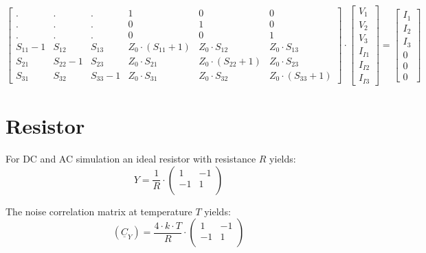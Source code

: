 \begin{equation}
\label{eqn:Sparam2mna}
\begin{bmatrix}
 . & . & .  &  1 & 0 & 0\\
 . & . & .  &  0 & 1 & 0\\
 . & . & .  &  0 & 0 & 1\\
S_{11}-1 &  S_{12} & S_{13} & Z_0\cdot (S_{11}+1) & Z_0\cdot S_{12} & Z_0\cdot S_{13}\\
S_{21} &  S_{22}-1 & S_{23} & Z_0\cdot S_{21} & Z_0\cdot (S_{22}+1) & Z_0\cdot S_{23}\\
S_{31} &  S_{32} & S_{33}-1 & Z_0\cdot S_{31} & Z_0\cdot S_{32} & Z_0\cdot (S_{33}+1)
\end{bmatrix}
\cdot
\begin{bmatrix}
V_{1}\\
V_{2}\\
V_{3}\\
I_{I1}\\
I_{I2}\\
I_{I3}
\end{bmatrix}
=
\begin{bmatrix}
I_{1}\\
I_{2}\\
I_{3}\\
0\\
0\\
0
\end{bmatrix}
\end{equation}


\section{Resistor}

For DC and AC simulation an ideal resistor with resistance $R$
yields:
\begin{equation}
Y = \dfrac{1}{R} \cdot
\begin{pmatrix}
 1 & -1 \\
-1 &  1 \\
\end{pmatrix}
\end{equation}

The noise correlation matrix at temperature $T$ yields:
\begin{equation}
(\underline{C}_Y) = \frac{4\cdot k\cdot T}{R} \cdot
\begin{pmatrix}
 1 & -1 \\
-1 &  1 \\
\end{pmatrix}
\end{equation}

